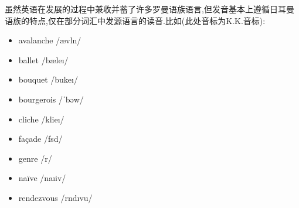 虽然英语在发展的过程中兼收并蓄了许多罗曼语族语言,但发音基本上遵循日耳曼语族的特点,仅在部分词汇中发源语言的读音.比如(此处音标为K.K.音标):
\begin{multicols}{3}
	\begin{itemize}
		\item avalanche /\textprimstress\ae v\textschwa l\textscripta\textlengthmark n\textesh/
		\item ballet /b\ae le\i\textlengthmark/
		\item bouquet /bu\textprimstress ke\i/
		\item bourgerois /ˈb\textupsilon ə\textyogh w\textscripta\textlengthmark/
		\item cliche /\textprimstress kli\textlengthmark\textesh e\i/
		\item façade /f\textschwa\textprimstress s\textscripta \textlengthmark d/
		\item genre /\textprimstress\textyogh\textscripta\textlengthmark r\textschwa/
		\item na\"ive /na\i \textprimstress i\textlengthmark v/
		\item rendezvous /\textprimstress r\textscripta\textlengthmark nd\i vu\textlengthmark/
	\end{itemize}
\end{multicols}

